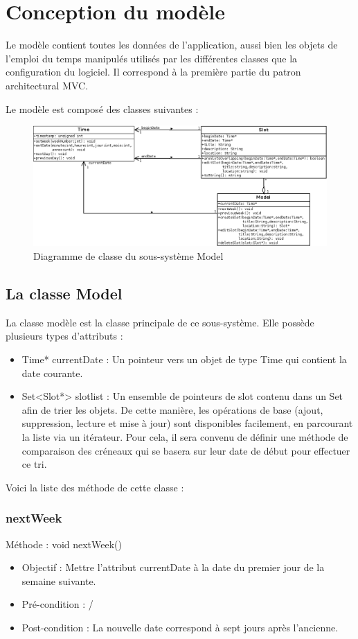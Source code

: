 \chapter{Conception du modèle}
	
	Le modèle contient toutes les données de l'application, aussi bien les objets de l'emploi du temps manipulés utilisés par les différentes classes que la configuration du logiciel. Il correspond à la première partie du patron architectural MVC. 
	
	Le modèle est composé des classes suivantes :
	\begin{figure}[!h]
		\centering
		\includegraphics[scale=0.45]{diagclasses_model.png}
		\caption{Diagramme de classe du sous-système \og Model \fg}
	\end{figure}
	\FloatBarrier
	
	\section{La classe Model}
		La classe modèle est la classe principale de ce sous-système. Elle possède plusieurs types d'attributs :
		\begin{itemize}
			\item Time* currentDate : Un pointeur vers un objet de type Time qui contient la date courante.
		    \item Set<Slot*> slotlist : Un ensemble de pointeurs de slot contenu dans un Set afin de trier les objets. De cette manière, les opérations de base (ajout, suppression, lecture et mise à jour) sont disponibles facilement, en parcourant la liste via un itérateur. Pour cela, il sera convenu de définir une méthode de comparaison des créneaux qui se basera sur leur date de début pour effectuer ce tri.
		\end{itemize}
	
		Voici la liste des méthode de cette classe :
		\subsection*{nextWeek}
            Méthode : void nextWeek()
			\begin{itemize}
				\item Objectif  : Mettre l'attribut currentDate à la date du premier jour de la semaine suivante.
				\item Pré-condition : /
				\item Post-condition : La nouvelle date correspond à sept jours après l'ancienne.
			\end{itemize}
			
